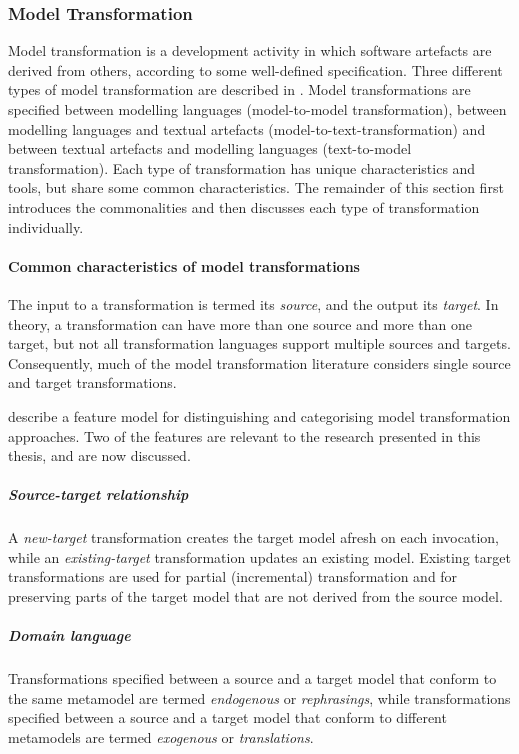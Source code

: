 \subsubsection{Model Transformation}
\label{subsubsec:model_transformation}
Model transformation is a development activity in which software artefacts are derived from others, according to some well-defined specification. Three different types of model transformation are described in \cite{kleppe03mda,kolovos09thesis}. Model transformations are specified between modelling languages (model-to-model transformation), between modelling languages and textual artefacts (model-to-text-transformation) and between textual artefacts and modelling languages (text-to-model transformation). Each type of transformation has unique characteristics and tools, but share some common characteristics. The remainder of this section first introduces the commonalities and then discusses each type of transformation individually.

\paragraph{Common characteristics of model transformations}
The input to a transformation is termed its \emph{source}, and the output its \emph{target}. In theory, a transformation can have more than one source and more than one target, but not all transformation languages support multiple sources and targets. Consequently, much of the model transformation literature considers single source and target transformations.

\cite{czarnecki06survey} describe a feature model for distinguishing and categorising model transformation approaches. Two of the features are relevant to the research presented in this thesis, and are now discussed. 

\subparagraph{Source-target relationship} A \emph{new-target} transformation creates the target model afresh on each invocation, while an \emph{existing-target} transformation updates an existing model. Existing target transformations are used for partial (incremental) transformation and for preserving parts of the target model that are not derived from the source model.

\subparagraph{Domain language} Transformations specified between a source and a target model that conform to the same metamodel are termed \emph{endogenous} or \emph{rephrasings}, while transformations specified between a source and a target model that conform to different metamodels are termed \emph{exogenous} or \emph{translations}.

